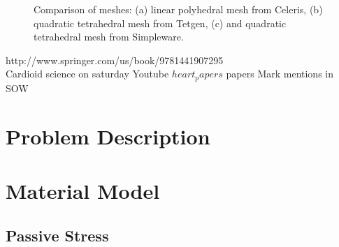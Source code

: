 \begin{figure}[ht!]
{\label{fig:comp-2}}	
	
%
\caption{Comparison of meshes: (a) linear polyhedral mesh from Celeris, (b) quadratic tetrahedral mesh from Tetgen, (c) and quadratic tetrahedral mesh from Simpleware.}
\label{fig:comp}
\end{figure}

{http://www.springer.com/us/book/9781441907295} \\
Cardioid science on saturday Youtube
$heart_papers$
papers Mark mentions in SOW

\section{Problem Description}
\label{Problem Description}

\section{Material Model}
\label{Material Model}

\subsection{Passive Stress}
\label{Passive Stress}

